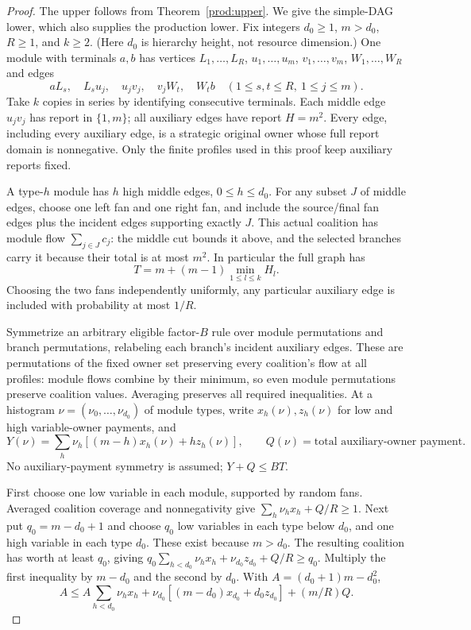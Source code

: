 \documentclass[11pt]{article}
\theoremstyle{definition}\newtheorem{definition}[theorem]{Definition}
\theoremstyle{remark}\newtheorem{remark}[theorem]{Remark}
\begin{document}
\begin{proof}
The upper follows from Theorem~\ref{prod:upper}. We give the simple-DAG lower,
which also supplies the production lower. Fix integers $d_0\ge1$, $m>d_0$,
$R\ge1$, and $k\ge2$. (Here $d_0$ is hierarchy height, not resource dimension.)
One module with terminals $a,b$ has vertices $L_1,\ldots,L_R$,
$u_1,\ldots,u_m$, $v_1,\ldots,v_m$, $W_1,\ldots,W_R$ and edges
\[
 aL_s,\quad L_su_j,\quad u_jv_j,\quad v_jW_t,\quad W_tb
 \quad(1\le s,t\le R,\ 1\le j\le m).
\]
Take $k$ copies in series by identifying consecutive terminals. Each middle
edge $u_jv_j$ has report in $\{1,m\}$; all auxiliary edges have report
$H=m^2$. Every edge, including every auxiliary edge, is a strategic original
owner whose full report domain is nonnegative. Only the finite profiles
used in this proof keep auxiliary reports fixed.

A type-$h$ module has $h$ high middle edges, $0\le h\le d_0$. For any subset
$J$ of middle edges, choose one left fan and one right fan, and include the
source/final fan edges plus the incident edges supporting exactly $J$.
This actual coalition has module flow $\sum_{j\in J}c_j$: the middle cut
bounds it above, and the selected branches carry it because their total is
at most $m^2$. In particular the full graph has
\begin{equation}\label{dag:value}
 T=m+(m-1)\min_{1\le l\le k}H_l.
\end{equation}
Choosing the two fans independently uniformly, any particular auxiliary
edge is included with probability at most $1/R$.

Symmetrize an arbitrary eligible factor-$B$ rule over module permutations
and branch permutations, relabeling each branch's incident auxiliary edges.
These are permutations of the fixed owner set preserving every coalition's
flow at all profiles: module flows combine by their minimum, so even module
permutations preserve coalition values. Averaging preserves all required
inequalities. At a histogram $\nu=(\nu_0,\ldots,\nu_{d_0})$ of module types,
write $x_h(\nu),z_h(\nu)$ for low and high variable-owner payments, and
\[
 Y(\nu)=\sum_h\nu_h[(m-h)x_h(\nu)+hz_h(\nu)],\qquad
 Q(\nu)=\text{total auxiliary-owner payment}.
\]
No auxiliary-payment symmetry is assumed; $Y+Q\le BT$.

First choose one low variable in each module, supported by random fans.
Averaged coalition coverage and nonnegativity give
$\sum_h\nu_hx_h+Q/R\ge1$. Next put $q_0=m-d_0+1$ and choose $q_0$ low
variables in each type below $d_0$, and one high variable in each type
$d_0$. These exist because $m>d_0$. The resulting coalition has worth at
least $q_0$, giving
$q_0\sum_{h<d_0}\nu_hx_h+\nu_{d_0}z_{d_0}+Q/R\ge q_0$.
Multiply the first inequality by $m-d_0$ and the second by $d_0$. With
$A=(d_0+1)m-d_0^2$,
\begin{equation}\label{dag:coalitions}
 A\le A\sum_{h<d_0}\nu_hx_h+
 \nu_{d_0}[(m-d_0)x_{d_0}+d_0z_{d_0}]+(m/R)Q.
\end{equation}


\end{proof}
\end{document}
